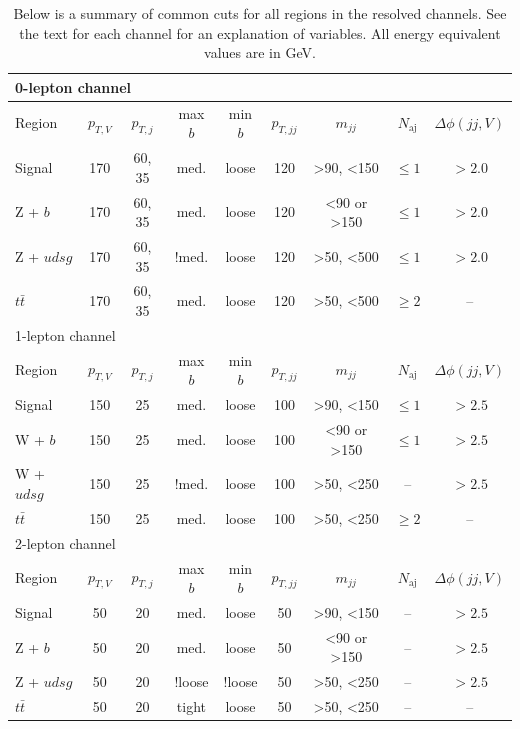 \begin{table}
  \centering
  \caption[Summary of resolved selection cuts]{
    Below is a summary of common cuts for all regions in the resolved channels.
    See the text for each channel for an explanation of variables.
    All energy equivalent values are in GeV.
  }
  \begin{tabular}{|l|c|c|c|c|c|c|c|c|}
    \hline
    \multicolumn{9}{|l|}{0-lepton channel} \\
    \hline
    Region & $p_{T,V}$ & $p_{T,j}$ & max $b$ & min $b$ & $p_{T,jj}$ & $m_{jj}$ & $N_\textrm{aj}$ & $\Delta\phi(jj, V)$ \\
    \hline
    Signal & 170 & 60, 35 & med. & loose & 120 & >90, <150 & $\le 1$ & $> 2.0$ \\
    Z + $b$ & 170 & 60, 35 & med. & loose & 120 & <90 or >150 & $\le 1$ & $> 2.0$ \\
    Z + $udsg$ & 170 & 60, 35 & !med. & loose & 120 & >50, <500 & $\le 1$ & $> 2.0$ \\
    $t\bar{t}$ & 170 & 60, 35 & med. & loose & 120 & >50, <500 & $\ge 2$ & -- \\
    \hline
    \hline
    \multicolumn{9}{|l|}{1-lepton channel} \\
    \hline
    Region & $p_{T,V}$ & $p_{T,j}$ & max $b$ & min $b$ & $p_{T,jj}$ & $m_{jj}$ & $N_\textrm{aj}$ & $\Delta\phi(jj, V)$ \\
    \hline
    Signal & 150 & 25 & med. & loose & 100 & >90, <150 & $\le 1$ & $> 2.5$ \\
    W + $b$ & 150 & 25 & med. & loose & 100 & <90 or >150 & $\le 1$ & $> 2.5$ \\
    W + $udsg$ & 150 & 25 & !med. & loose & 100 & >50, <250 & -- & $> 2.5$ \\
    $t\bar{t}$ & 150 & 25 & med. & loose & 100 & >50, <250 & $\ge 2$ & -- \\
    \hline
    \hline
    \multicolumn{9}{|l|}{2-lepton channel} \\
    \hline
    Region & $p_{T,V}$ & $p_{T,j}$ & max $b$ & min $b$ & $p_{T,jj}$ & $m_{jj}$ & $N_\textrm{aj}$ & $\Delta\phi(jj, V)$ \\
    \hline
    Signal & 50 & 20 & med. & loose & 50 & >90, <150 & -- & $> 2.5$ \\
    Z + $b$ & 50 & 20 & med. & loose & 50 & <90 or >150 & -- & $> 2.5$ \\
    Z + $udsg$ & 50 & 20 & !loose & !loose & 50 & >50, <250 & -- & $> 2.5$ \\
    $t\bar{t}$ & 50 & 20 & tight & loose & 50 & >50, <250 & -- & -- \\
    \hline
  \end{tabular}
  \label{tab:resolved}
\end{table}

